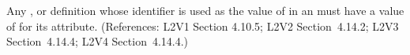 Any \Compartment, \Species or \Parameter definition whose identifier is used
as the value of  in an \EventAssignment must have a value of
 for its  attribute.  (References: L2V1 Section
4.10.5; L2V2 Section~4.14.2; L2V3 Section~4.14.4; L2V4
Section~4.14.4.)
